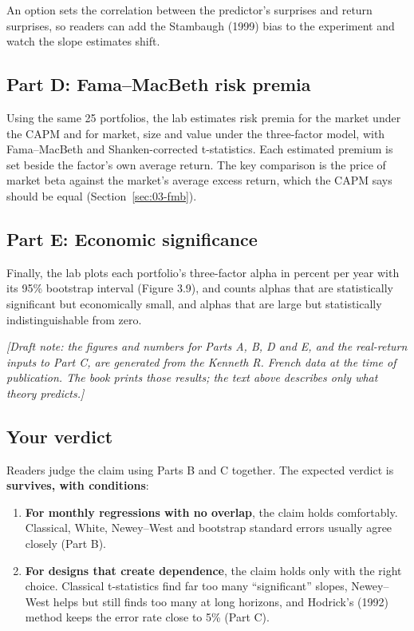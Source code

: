An option sets the correlation between the predictor's surprises and return surprises, so readers can add the Stambaugh (1999) bias to the experiment and watch the slope estimates shift.

\subsection*{Part D: Fama--MacBeth risk premia}

Using the same 25 portfolios, the lab estimates risk premia for the market under the CAPM and for market, size and value under the three-factor model, with Fama--MacBeth and Shanken-corrected t-statistics. Each estimated premium is set beside the factor's own average return. The key comparison is the price of market beta against the market's average excess return, which the CAPM says should be equal (Section~\ref{sec:03-fmb}).

\subsection*{Part E: Economic significance}

Finally, the lab plots each portfolio's three-factor alpha in percent per year with its 95\% bootstrap interval (Figure 3.9), and counts alphas that are statistically significant but economically small, and alphas that are large but statistically indistinguishable from zero.

\emph{[Draft note: the figures and numbers for Parts A, B, D and E, and the real-return inputs to Part C, are generated from the Kenneth R. French data at the time of publication. The book prints those results; the text above describes only what theory predicts.]}

\subsection*{Your verdict}

Readers judge the claim using Parts B and C together. The expected verdict is \textbf{survives, with conditions}:

\begin{enumerate}
  \item \textbf{For monthly regressions with no overlap}, the claim holds comfortably. Classical, White, Newey--West and bootstrap standard errors usually agree closely (Part B).
  \item \textbf{For designs that create dependence}, the claim holds only with the right choice. Classical t-statistics find far too many ``significant'' slopes, Newey--West helps but still finds too many at long horizons, and Hodrick's (1992) method keeps the error rate close to 5\% (Part C).
\end{enumerate}

